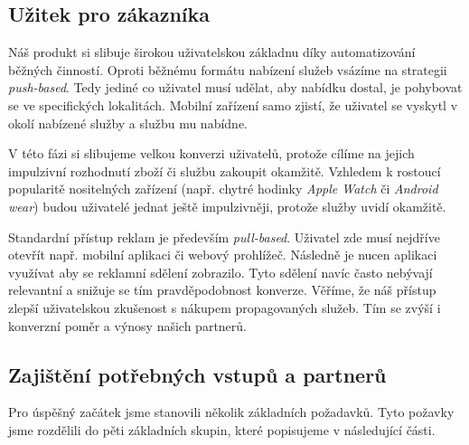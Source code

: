 \documentclass[12pt,czech]{article}
\begin{document}
\subsection{Užitek pro zákazníka}

Náš produkt si slibuje širokou uživatelskou základnu díky automatizování běžných činností.
Oproti běžnému formátu nabízení služeb vsázíme na strategii \textit{push-based}.
Tedy jediné co uživatel musí udělat, aby nabídku dostal, je pohybovat se ve specifických lokalitách.
Mobilní zařízení samo zjistí, že uživatel se vyskytl v okolí nabízené služby a službu mu nabídne.

V této fázi si slibujeme velkou konverzi uživatelů, protože cílíme na jejich impulzivní rozhodnutí zboží či službu zakoupit okamžitě.
Vzhledem k rostoucí popularitě nositelných zařízení (např. chytré hodinky \textit{Apple Watch} či \textit{Android wear}) budou uživatelé jednat ještě impulzivněji, protože služby uvidí okamžitě.

Standardní přístup reklam je především \textit{pull-based}.
Uživatel zde musí nejdříve otevřít např. mobilní aplikaci či webový prohlížeč.
Následně je nucen aplikaci využívat aby se reklamní sdělení zobrazilo.
Tyto sdělení navíc často nebývají relevantní a snižuje se tím pravděpodobnost konverze.
Věříme, že náš přístup zlepší uživatelskou zkušenost s nákupem propagovaných služeb.
Tím se zvýší i konverzní poměr a výnosy našich partnerů.

\subsection{Zajištění potřebných vstupů a partnerů}

Pro úspěšný začátek jsme stanovili několik základních požadavků.
Tyto požavky jsme rozdělili do pěti základních skupin, které popisujeme v následující části.
\end{document}
